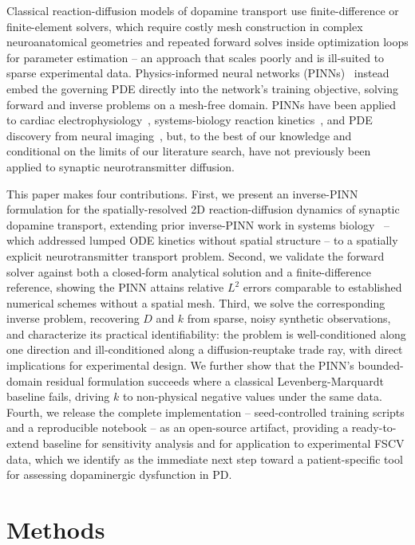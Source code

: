 \documentclass[12pt]{article}
\begin{document}
Classical reaction-diffusion models of dopamine transport
\cite{Nicholson1981, Rice2008, Wiencke2020} use finite-difference
or finite-element solvers, which require costly mesh construction
in complex neuroanatomical geometries and repeated forward solves
inside optimization loops for parameter estimation -- an approach
that scales poorly and is ill-suited to sparse experimental data.
Physics-informed neural networks (PINNs)~\cite{Raissi2019}
instead embed the governing PDE directly into the network's
training objective, solving forward and inverse problems on a
mesh-free domain. PINNs have been applied to cardiac
electrophysiology~\cite{Sahli2020}, systems-biology reaction
kinetics~\cite{Yazdani2020}, and PDE discovery from neural
imaging~\cite{Rudy2017}, but, to the best of our knowledge and
conditional on the limits of our literature search, have not
previously been applied to synaptic neurotransmitter diffusion.

This paper makes four contributions. First, we present an
inverse-PINN formulation for the spatially-resolved 2D
reaction-diffusion dynamics of synaptic dopamine transport,
extending prior inverse-PINN work in systems
biology~\cite{Yazdani2020} -- which addressed lumped ODE
kinetics without spatial structure -- to a spatially explicit
neurotransmitter transport problem. Second, we validate the
forward solver against both a closed-form analytical solution
and a finite-difference reference, showing the PINN attains
relative $L^2$ errors comparable to established numerical
schemes without a spatial mesh. Third, we solve the
corresponding inverse problem, recovering $D$ and $k$ from
sparse, noisy synthetic observations, and characterize its
practical identifiability: the problem is well-conditioned
along one direction and ill-conditioned along a
diffusion-reuptake trade ray, with direct implications for
experimental design. We further show that the PINN's
bounded-domain residual formulation succeeds where a classical
Levenberg-Marquardt baseline fails, driving $k$ to non-physical
negative values under the same data. Fourth, we release the
complete implementation -- seed-controlled training scripts and
a reproducible notebook -- as an open-source artifact, providing
a ready-to-extend baseline for sensitivity analysis and for
application to experimental FSCV data, which we identify as the
immediate next step toward a patient-specific tool for assessing
dopaminergic dysfunction in PD.

\section{Methods}
\label{sec:methods}
\end{document}
